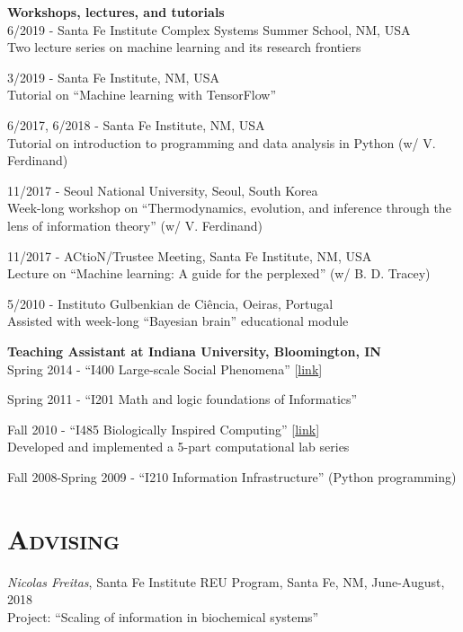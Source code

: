 \documentclass[margin,line,centered]{res}
\begin{document}
\begin{resume}
\vspace{5pt}


\textbf{Workshops, lectures, and tutorials}\\
6/2019 - Santa Fe Institute Complex Systems Summer School, NM, USA\\
Two lecture series on machine learning and its research frontiers

3/2019 - Santa Fe Institute, NM, USA\\
Tutorial on ``Machine learning with TensorFlow''

6/2017, 6/2018 - Santa Fe Institute, NM, USA\\
Tutorial on introduction to programming and data analysis in Python (w/ V. Ferdinand)

11/2017 - Seoul National University, Seoul, South Korea \\
Week-long workshop on ``Thermodynamics, evolution, and inference through the lens of information theory'' (w/ V. Ferdinand)

11/2017 - ACtioN/Trustee Meeting, Santa Fe Institute, NM, USA\\
Lecture on ``Machine learning: A guide for the perplexed'' (w/ B. D. Tracey)

5/2010 - Instituto Gulbenkian de Ciência, Oeiras, Portugal\\
Assisted with week-long ``Bayesian brain'' educational module

\vspace{5pt}

\textbf{Teaching Assistant at Indiana University, Bloomington, IN}\\
Spring 2014 - ``I400 Large-scale Social Phenomena'' {[}\href{http://tuvalu.santafe.edu/~simon/page11/page11.html}{link}{]} 

Spring 2011 - ``I201 Math and logic foundations of Informatics''

Fall 2010 - ``I485 Biologically Inspired Computing'' {[}\href{https://web.archive.org/web/20110310071102/http://www.informatics.indiana.edu/rocha/i-bic/index.html}{link}{]}\\
Developed and implemented a 5-part computational lab series

Fall 2008-Spring 2009 - ``I210 Information Infrastructure'' (Python programming)



\section{\textsc{Advising}}
\emph{Nicolas Freitas}, Santa Fe Institute REU Program, Santa Fe, NM, June-August, 2018 \\
Project: ``Scaling of information in biochemical systems''


\end{resume}
\end{document}
